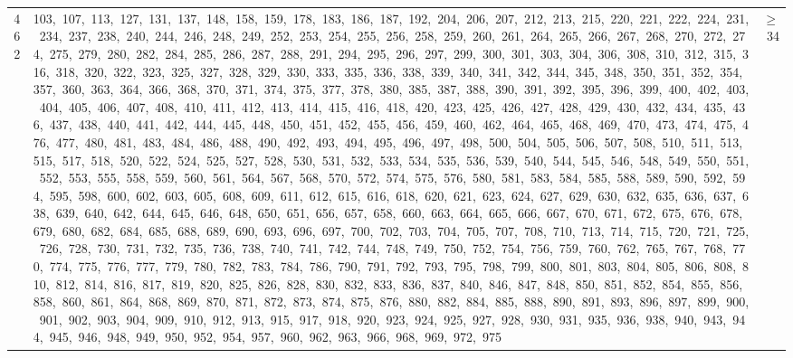 \begin{longtable}{c|p{}|r}
462 & 103,\ 107,\ 113,\ 127,\ 131,\ 137,\ 148,\ 158,\ 159,\ 178,\ 183,\ 186,\ 187,\ 192,\ 204,\ 206,\ 207,\ 212,\ 213,\ 215,\ 220,\ 221,\ 222,\ 224,\ 231,\ 234,\ 237,\ 238,\ 240,\ 244,\ 246,\ 248,\ 249,\ 252,\ 253,\ 254,\ 255,\ 256,\ 258,\ 259,\ 260,\ 261,\ 264,\ 265,\ 266,\ 267,\ 268,\ 270,\ 272,\ 274,\ 275,\ 279,\ 280,\ 282,\ 284,\ 285,\ 286,\ 287,\ 288,\ 291,\ 294,\ 295,\ 296,\ 297,\ 299,\ 300,\ 301,\ 303,\ 304,\ 306,\ 308,\ 310,\ 312,\ 315,\ 316,\ 318,\ 320,\ 322,\ 323,\ 325,\ 327,\ 328,\ 329,\ 330,\ 333,\ 335,\ 336,\ 338,\ 339,\ 340,\ 341,\ 342,\ 344,\ 345,\ 348,\ 350,\ 351,\ 352,\ 354,\ 357,\ 360,\ 363,\ 364,\ 366,\ 368,\ 370,\ 371,\ 374,\ 375,\ 377,\ 378,\ 380,\ 385,\ 387,\ 388,\ 390,\ 391,\ 392,\ 395,\ 396,\ 399,\ 400,\ 402,\ 403,\ 404,\ 405,\ 406,\ 407,\ 408,\ 410,\ 411,\ 412,\ 413,\ 414,\ 415,\ 416,\ 418,\ 420,\ 423,\ 425,\ 426,\ 427,\ 428,\ 429,\ 430,\ 432,\ 434,\ 435,\ 436,\ 437,\ 438,\ 440,\ 441,\ 442,\ 444,\ 445,\ 448,\ 450,\ 451,\ 452,\ 455,\ 456,\ 459,\ 460,\ 462,\ 464,\ 465,\ 468,\ 469,\ 470,\ 473,\ 474,\ 475,\ 476,\ 477,\ 480,\ 481,\ 483,\ 484,\ 486,\ 488,\ 490,\ 492,\ 493,\ 494,\ 495,\ 496,\ 497,\ 498,\ 500,\ 504,\ 505,\ 506,\ 507,\ 508,\ 510,\ 511,\ 513,\ 515,\ 517,\ 518,\ 520,\ 522,\ 524,\ 525,\ 527,\ 528,\ 530,\ 531,\ 532,\ 533,\ 534,\ 535,\ 536,\ 539,\ 540,\ 544,\ 545,\ 546,\ 548,\ 549,\ 550,\ 551,\ 552,\ 553,\ 555,\ 558,\ 559,\ 560,\ 561,\ 564,\ 567,\ 568,\ 570,\ 572,\ 574,\ 575,\ 576,\ 580,\ 581,\ 583,\ 584,\ 585,\ 588,\ 589,\ 590,\ 592,\ 594,\ 595,\ 598,\ 600,\ 602,\ 603,\ 605,\ 608,\ 609,\ 611,\ 612,\ 615,\ 616,\ 618,\ 620,\ 621,\ 623,\ 624,\ 627,\ 629,\ 630,\ 632,\ 635,\ 636,\ 637,\ 638,\ 639,\ 640,\ 642,\ 644,\ 645,\ 646,\ 648,\ 650,\ 651,\ 656,\ 657,\ 658,\ 660,\ 663,\ 664,\ 665,\ 666,\ 667,\ 670,\ 671,\ 672,\ 675,\ 676,\ 678,\ 679,\ 680,\ 682,\ 684,\ 685,\ 688,\ 689,\ 690,\ 693,\ 696,\ 697,\ 700,\ 702,\ 703,\ 704,\ 705,\ 707,\ 708,\ 710,\ 713,\ 714,\ 715,\ 720,\ 721,\ 725,\ 726,\ 728,\ 730,\ 731,\ 732,\ 735,\ 736,\ 738,\ 740,\ 741,\ 742,\ 744,\ 748,\ 749,\ 750,\ 752,\ 754,\ 756,\ 759,\ 760,\ 762,\ 765,\ 767,\ 768,\ 770,\ 774,\ 775,\ 776,\ 777,\ 779,\ 780,\ 782,\ 783,\ 784,\ 786,\ 790,\ 791,\ 792,\ 793,\ 795,\ 798,\ 799,\ 800,\ 801,\ 803,\ 804,\ 805,\ 806,\ 808,\ 810,\ 812,\ 814,\ 816,\ 817,\ 819,\ 820,\ 825,\ 826,\ 828,\ 830,\ 832,\ 833,\ 836,\ 837,\ 840,\ 846,\ 847,\ 848,\ 850,\ 851,\ 852,\ 854,\ 855,\ 856,\ 858,\ 860,\ 861,\ 864,\ 868,\ 869,\ 870,\ 871,\ 872,\ 873,\ 874,\ 875,\ 876,\ 880,\ 882,\ 884,\ 885,\ 888,\ 890,\ 891,\ 893,\ 896,\ 897,\ 899,\ 900,\ 901,\ 902,\ 903,\ 904,\ 909,\ 910,\ 912,\ 913,\ 915,\ 917,\ 918,\ 920,\ 923,\ 924,\ 925,\ 927,\ 928,\ 930,\ 931,\ 935,\ 936,\ 938,\ 940,\ 943,\ 944,\ 945,\ 946,\ 948,\ 949,\ 950,\ 952,\ 954,\ 957,\ 960,\ 962,\ 963,\ 966,\ 968,\ 969,\ 972,\ 975 & $\ge$ 34 \\

\end{longtable}
